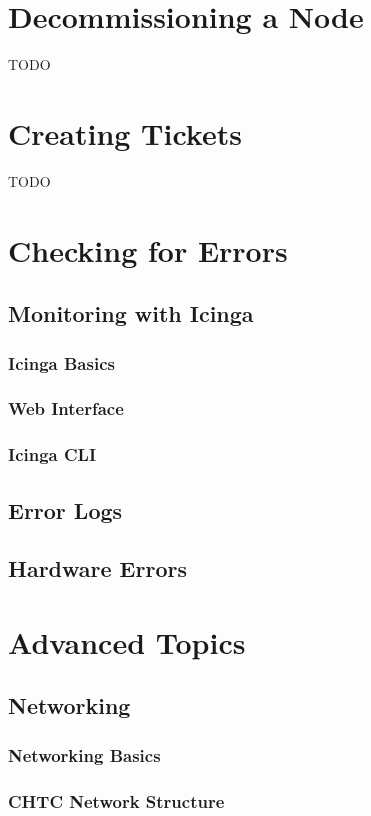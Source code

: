 \documentclass[10pt,letterpaper]{article}
\begin{document}
\section{Decommissioning a Node}
    TODO
\clearpage

\section{Creating Tickets}
    TODO
\clearpage

\section{Checking for Errors}
    \subsection{Monitoring with Icinga}
        \subsubsection{Icinga Basics}
        \subsubsection{Web Interface}
        \subsubsection{Icinga CLI}
    \subsection{Error Logs}
    \subsection{Hardware Errors}
\clearpage

\section{Advanced Topics}
    \subsection{Networking}
        \subsubsection{Networking Basics}
        \subsubsection{CHTC Network Structure}
\end{document}
